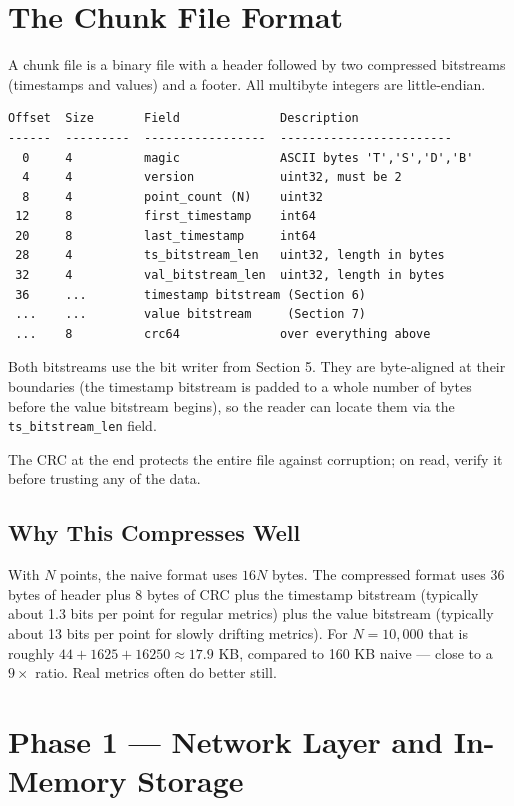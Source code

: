 \documentclass[11pt,a4paper]{article}
\begin{document}
\section{The Chunk File Format}

A chunk file is a binary file with a header followed by two compressed bitstreams (timestamps and values) and a footer. All multibyte integers are little-endian.

\begin{codebox}
\begin{lstlisting}
Offset  Size       Field              Description
------  ---------  -----------------  ------------------------
  0     4          magic              ASCII bytes 'T','S','D','B'
  4     4          version            uint32, must be 2
  8     4          point_count (N)    uint32
 12     8          first_timestamp    int64
 20     8          last_timestamp     int64
 28     4          ts_bitstream_len   uint32, length in bytes
 32     4          val_bitstream_len  uint32, length in bytes
 36     ...        timestamp bitstream (Section 6)
 ...    ...        value bitstream     (Section 7)
 ...    8          crc64              over everything above
\end{lstlisting}
\end{codebox}

Both bitstreams use the bit writer from Section 5. They are byte-aligned at their boundaries (the timestamp bitstream is padded to a whole number of bytes before the value bitstream begins), so the reader can locate them via the \texttt{ts\_bitstream\_len} field.

The CRC at the end protects the entire file against corruption; on read, verify it before trusting any of the data.

\subsection{Why This Compresses Well}
With $N$ points, the naive format uses $16N$ bytes. The compressed format uses 36 bytes of header plus 8 bytes of CRC plus the timestamp bitstream (typically about 1.3 bits per point for regular metrics) plus the value bitstream (typically about 13 bits per point for slowly drifting metrics). For $N = 10{,}000$ that is roughly $44 + 1625 + 16250 \approx 17.9$ KB, compared to 160 KB naive --- close to a $9\times$ ratio. Real metrics often do better still.

\section{Phase 1 --- Network Layer and In-Memory Storage}
\end{document}

